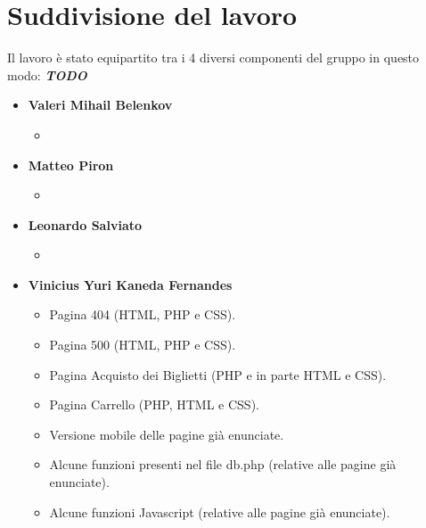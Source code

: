 \section{Suddivisione del lavoro}
Il lavoro è stato equipartito tra i 4 diversi componenti del gruppo in questo modo:
\textbf{\textit{TODO}}
\begin{itemize}
    \item \textbf{Valeri Mihail Belenkov}
        \begin{itemize}
            \item 
        \end{itemize}
    \item \textbf{Matteo Piron}
        \begin{itemize}
            \item 
        \end{itemize}
    \item \textbf{Leonardo Salviato}
        \begin{itemize}
            \item 
        \end{itemize}
    \item \textbf{Vinicius Yuri Kaneda Fernandes}
        \begin{itemize}
            \item Pagina 404 (HTML, PHP e CSS).
            \item Pagina 500 (HTML, PHP e CSS).
            \item Pagina Acquisto dei Biglietti (PHP e in parte HTML e CSS).
            \item Pagina Carrello (PHP, HTML e CSS).
            \item Versione mobile delle pagine già enunciate.
            \item Alcune funzioni presenti nel file db.php (relative alle pagine già enunciate).
            \item Alcune funzioni Javascript (relative alle pagine già enunciate).
        \end{itemize}
\end{itemize}